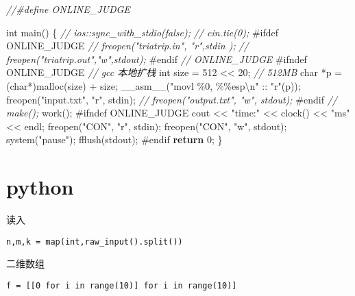 \documentclass[
]{article}
\newenvironment{Shaded}{}{}
\newcommand{\CommentTok}[1]{\textcolor[rgb]{0.38,0.63,0.69}{\textit{#1}}}
\newcommand{\ControlFlowTok}[1]{\textcolor[rgb]{0.00,0.44,0.13}{\textbf{#1}}}
\newcommand{\DataTypeTok}[1]{\textcolor[rgb]{0.56,0.13,0.00}{#1}}
\newcommand{\DecValTok}[1]{\textcolor[rgb]{0.25,0.63,0.44}{#1}}
\newcommand{\ExtensionTok}[1]{#1}
\newcommand{\NormalTok}[1]{#1}
\newcommand{\PreprocessorTok}[1]{\textcolor[rgb]{0.74,0.48,0.00}{#1}}
\newcommand{\SpecialCharTok}[1]{\textcolor[rgb]{0.25,0.44,0.63}{#1}}
\newcommand{\StringTok}[1]{\textcolor[rgb]{0.25,0.44,0.63}{#1}}
\begin{document}
\begin{Shaded}
\begin{Highlighting}[]
\CommentTok{//\#define ONLINE\_JUDGE}
 
\DataTypeTok{int}\NormalTok{ main()}
\NormalTok{\{}
    \CommentTok{// ios::sync\_with\_stdio(false);}
    \CommentTok{// cin.tie(0);}
\PreprocessorTok{\#ifdef ONLINE\_JUDGE}
    \CommentTok{// freopen("triatrip.in", "r",stdin );}
    \CommentTok{// freopen("triatrip.out","w",stdout);}
\PreprocessorTok{\#endif }\CommentTok{// ONLINE\_JUDGE}
\PreprocessorTok{\#ifndef ONLINE\_JUDGE}
    \CommentTok{// gcc 本地扩栈}
    \DataTypeTok{int}\NormalTok{ size = }\DecValTok{512}\NormalTok{ \textless{}\textless{} }\DecValTok{20}\NormalTok{; }\CommentTok{// 512MB  }
    \DataTypeTok{char}\NormalTok{ *p = (}\DataTypeTok{char}\NormalTok{*)malloc(size) + size;  }
    \ExtensionTok{\_\_asm\_\_}\NormalTok{(}\StringTok{"movl \%0, }\SpecialCharTok{\%\%}\StringTok{esp}\SpecialCharTok{\textbackslash{}n}\StringTok{"}\NormalTok{ :: }\StringTok{"r"}\NormalTok{(p)); }
\NormalTok{    freopen(}\StringTok{"input.txt"}\NormalTok{, }\StringTok{"r"}\NormalTok{, stdin);}
    \CommentTok{// freopen("output.txt", "w", stdout);}
\PreprocessorTok{\#endif}
    \CommentTok{// make();}
\NormalTok{    work();}
\PreprocessorTok{\#ifndef ONLINE\_JUDGE}
\NormalTok{    cout \textless{}\textless{} }\StringTok{"time:"}\NormalTok{ \textless{}\textless{} clock() \textless{}\textless{} }\StringTok{"ms"}\NormalTok{ \textless{}\textless{} endl;}
\NormalTok{    freopen(}\StringTok{"CON"}\NormalTok{, }\StringTok{"r"}\NormalTok{, stdin);}
\NormalTok{    freopen(}\StringTok{"CON"}\NormalTok{, }\StringTok{"w"}\NormalTok{, stdout);}
\NormalTok{    system(}\StringTok{"pause"}\NormalTok{);}
\NormalTok{    fflush(stdout);}
\PreprocessorTok{\#endif}
    \ControlFlowTok{return} \DecValTok{0}\NormalTok{;}
\NormalTok{\}}
\end{Highlighting}
\end{Shaded}

\hypertarget{python}{%
\section{python}\label{python}}

读入

\begin{verbatim}
n,m,k = map(int,raw_input().split())
\end{verbatim}

二维数组

\begin{verbatim}
f = [[0 for i in range(10)] for i in range(10)]
\end{verbatim}
\end{document}
